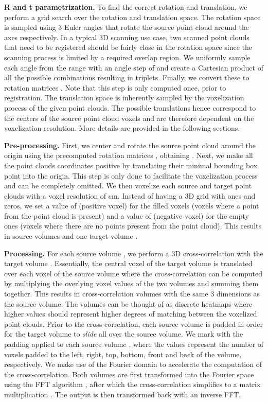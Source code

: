 \documentclass{bmvc2k}
\begin{document}
\textbf{R and t parametrization.} To find the correct rotation and translation, we perform a grid search over the rotation and translation space. The rotation space is sampled using 3 Euler angles  that rotate the source point cloud  around the  axes respectively. In a typical 3D scanning use case, two scanned point clouds that need to be registered should be fairly close in the rotation space since the scanning process is limited by a required overlap region. 
We uniformly sample each angle from the range  with an angle step of  and create a Cartesian product of all the possible combinations resulting in  triplets. Finally, we convert these to rotation matrices . Note that this step is only computed once, prior to registration.
The translation space is inherently sampled by the voxelization process of the given point clouds. The possible translations hence correspond to the centers of the source point cloud voxels and are therefore dependent on the voxelization resolution. More details are provided in the following  sections.

\textbf{Pre-processing.} \label{sec:pre-processing} First, we center and rotate the source point cloud  around the origin using the precomputed rotation matrices , obtaining . Next, we make all the point clouds coordinates positive by translating their minimal bounding box point into the origin. This step is only done to facilitate the voxelization process and can be completely omitted. We then voxelize each source  and target  point clouds with a voxel resolution of  cm. 
Instead of having a 3D grid with ones and zeros, we set a value of  (positive voxel) for the filled voxels (voxels where a point from the point cloud is present) and a value of  (negative voxel) for the empty ones (voxels where there are no points present from the point cloud). 
This results in  source volumes  and one target volume . 

\textbf{Processing.} \label{sec:processing} For each source volume , we perform a 3D cross-correlation with the target volume . Essentially, the central voxel of the target volume is translated over each voxel of the source volume where the cross-correlation can be computed by multiplying the overlying voxel values of the two volumes and summing them together. This results in  cross-correlation volumes  with the same 3 dimensions as the source volume. The volumes can be thought of as discrete heatmaps where higher values should represent higher degrees of matching between the voxelized point clouds.
Prior to the cross-correlation, each source volume is padded in order for the target volume to \textit{slide} all over the source volume. We mark with  the padding applied to each source volume , where the values represent the number of voxels padded to the left, right, top, bottom, front and back of the volume, respectively. 
We make use of the Fourier domain to accelerate the computation of the cross-correlation. Both volumes are first transformed into the Fourier space using the FFT algorithm \cite{fft}, after which the cross-correlation simplifies to a matrix multiplication \cite{fft-book}. The output is then transformed back with an inverse FFT. 
\end{document}
